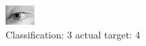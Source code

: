\begin{figure}[h!]
\begin{center}
\includegraphics[width=0.60\columnwidth]{figures/ID2881_class_3_target_4.png}
\end{center}
\caption{ Classification: 3 actual target: 4}
\label{fig:ID2881_class_3_target_4}
\end{figure}
